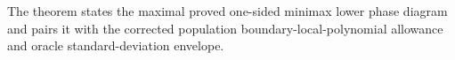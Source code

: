 The theorem states the maximal proved one-sided minimax lower phase diagram and pairs it with the corrected population boundary-local-polynomial allowance and oracle standard-deviation envelope.